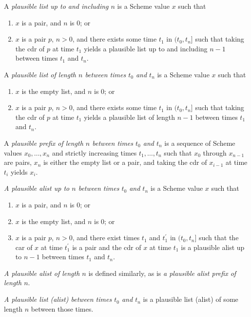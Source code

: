 A \textit{plausible list up to and including $n$} is a
Scheme value $x$ such that
%
\begin{enumerate}
\item $x$ is a pair, and $n$ is $0$; or
\item $x$ is a pair $p$, $n > 0$, and there exists some time
  $t_1$ in $(t_0,t_n]$ such that taking the cdr of $p$ at
  time $t_1$ yields a plausible list up to and including $n-1$ between
  times $t_1$ and $t_n$.
\end{enumerate}

A \textit{plausible list of length $n$ between times $t_0$ and $t_n$}
is a Scheme value $x$ such that

\begin{enumerate}
\item $x$ is the empty list, and $n$ is $0$; or
\item $x$ is a pair $p$, $n > 0$, and there exists some time
  $t_1$ in $(t_0,t_n]$ such that taking the cdr of $p$ at
  time $t_1$ yields a plausible list of length $n-1$
  between times $t_1$ and $t_n$.
\end{enumerate}

A \textit{plausible prefix of length $n$ between times $t_0$ and
  $t_n$} is a sequence of Scheme values $x_0,\ldots,x_n$ and strictly
increasing times $t_1,\ldots,t_n$ such that $x_0$ through $x_{n-1}$
are pairs, $x_n$ is either the empty list or a pair, and taking the
cdr of $x_{i-1}$ at time $t_i$ yields $x_i$.

\textit{A plausible alist up to $n$ between times $t_0$ and $t_n$} is
a Scheme value $x$ such that
\begin{enumerate}
\item $x$ is a pair, and $n$ is $0$; or
\item $x$ is the empty list, and $n$ is $0$; or
\item $x$ is a pair $p$, $n > 0$, and there exist times
  $t_1$ and $t_1^\prime$ in $(t_0,t_n]$ such that
  the car of $x$ at time $t_1^\prime$ is a pair and
  the cdr of $x$ at time $t_1$ is a plausible alist up to $n-1$
  between times $t_1$ and $t_n$.
\end{enumerate}

\textit{A plausible alist of length $n$} is defined similarly, as is
\textit{a plausible alist prefix of length $n$}.

\textit{A plausible list (alist) between times $t_0$ and $t_n$} is a
plausible list (alist) of some length $n$ between those times.

